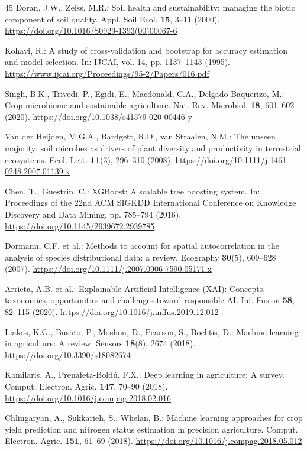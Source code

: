 \documentclass[runningheads,a4paper,oribibl]{llncs}
\begin{document}
\begin{thebibliography}{45}
Doran, J.W., Zeiss, M.R.: Soil health and sustainability: managing the biotic component of soil quality. Appl. Soil Ecol. \textbf{15}, 3--11 (2000). \url{https://doi.org/10.1016/S0929-1393(00)00067-6}



Kohavi, R.: A study of cross-validation and bootstrap for accuracy estimation and model selection. In: IJCAI, vol. 14, pp. 1137--1143 (1995). \url{https://www.ijcai.org/Proceedings/95-2/Papers/016.pdf}

Singh, B.K., Trivedi, P., Egidi, E., Macdonald, C.A., Delgado-Baquerizo, M.: Crop microbiome and sustainable agriculture. Nat. Rev. Microbiol. \textbf{18}, 601--602 (2020). \url{https://doi.org/10.1038/s41579-020-00446-y}

Van der Heijden, M.G.A., Bardgett, R.D., van Straalen, N.M.: The unseen majority: soil microbes as drivers of plant diversity and productivity in terrestrial ecosystems. Ecol. Lett. \textbf{11}(3), 296--310 (2008). \url{https://doi.org/10.1111/j.1461-0248.2007.01139.x}

Chen, T., Guestrin, C.: XGBoost: A scalable tree boosting system. In: Proceedings of the 22nd ACM SIGKDD International Conference on Knowledge Discovery and Data Mining, pp. 785--794 (2016). \url{https://doi.org/10.1145/2939672.2939785}

Dormann, C.F. et al.: Methods to account for spatial autocorrelation in the analysis of species distributional data: a review. Ecography \textbf{30}(5), 609--628 (2007). \url{https://doi.org/10.1111/j.2007.0906-7590.05171.x}

Arrieta, A.B. et al.: Explainable Artificial Intelligence (XAI): Concepts, taxonomies, opportunities and challenges toward responsible AI. Inf. Fusion \textbf{58}, 82--115 (2020). \url{https://doi.org/10.1016/j.inffus.2019.12.012}

Liakos, K.G., Busato, P., Moshou, D., Pearson, S., Bochtis, D.: Machine learning in agriculture: A review. Sensors \textbf{18}(8), 2674 (2018). \url{https://doi.org/10.3390/s18082674}

Kamilaris, A., Prenafeta-Boldú, F.X.: Deep learning in agriculture: A survey. Comput. Electron. Agric. \textbf{147}, 70--90 (2018). \url{https://doi.org/10.1016/j.compag.2018.02.016}

Chlingaryan, A., Sukkarieh, S., Whelan, B.: Machine learning approaches for crop yield prediction and nitrogen status estimation in precision agriculture. Comput. Electron. Agric. \textbf{151}, 61--69 (2018). \url{https://doi.org/10.1016/j.compag.2018.05.012}


\end{thebibliography}
\end{document}
